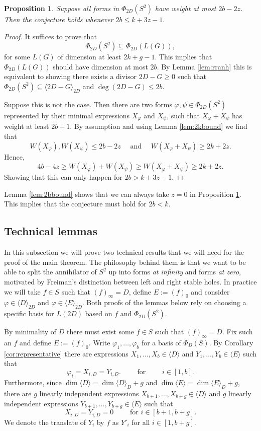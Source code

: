 \documentclass[12pt]{amsart}
\renewcommand{\leq}{\leqslant}
\renewcommand{\geq}{\geqslant}
\newtheorem{proposition}[theorem]{Proposition}
\theoremstyle{definition}
\newcommand{\divi}[1]{\langle #1 \rangle}
\begin{document}
	\begin{proposition} \label{prop:zbound}
		Suppose all forms in $\Phi_{2D}(S^2)$ have weight at most $2b - 2z$. Then the conjecture holds whenever $2b \leq k + 3z-1.$ 
	\end{proposition}
	\begin{proof}
		It suffices to prove that 
		$$\Phi_{2D}(S^2) \subseteq \Phi_{2D}(L(G)),$$
		for some $L(G)$ of dimension at least $2k + g - 1.$ This implies that $\Phi_{2D}(L(G))$ should have dimension at most $2b$. By Lemma \ref{lem:rranh} this is equivalent to showing there exists a divisor $2D - G \geq 0$ such that $\Phi_{2D}(S^2) \subseteq \divi {2D - G}_{2D}$ and $\deg(2D - G) \leq 2b$. 
		
		Suppose this is not the case. Then there are two forms $\varphi, \psi \in \Phi_{2D}(S^2)$ represented by their minimal expressions $X_\varphi$ and $X_\psi$, such that $X_\varphi + X_\psi$ has weight at least $2b + 1$. By assumption and using Lemma \ref{lem:2kbound} we find that 
		$$W(X_\varphi), W(X_\psi) \leq 2b - 2z \quad \text{ and } \quad W(X_\varphi + X_\psi) \geq 2k + 2z.$$ 
		Hence, 
		$$4b - 4z \geq W(X_\varphi) + W(X_\psi) \geq W(X_\varphi + X_\psi) \geq 2k+2z.$$ 
		Showing that this can only happen for $2b > k+3z - 1$. 
	\end{proof}
	
	Lemma \ref{lem:2bbound} shows that we can always take $z = 0$ in Proposition \ref{prop:zbound}. This implies that the conjecture must hold for $2b < k$.
	
	\subsection{Technical lemmas} \label{subs:basis} In this subsection we will prove two technical results that we will need for the proof of the main theorem. The philosophy behind them is that we want to be able to split the annihilator of $S^2$ up into forms \textit{at infinity} and forms \textit{at zero}, motivated by Freiman's distinction between left and right stable holes. In practice we will take $f \in S$ such that $(f)_\infty = D$, define $E := (f)_0$ and consider $\varphi \in \divi D_{2D}$ and $\varphi \in \divi E_{2D}$. Both proofs of the lemmas below rely on choosing a specific basis for $L(2D)$ based on $f$ and  $\Phi_{2D}(S^2)$. 
	
	By minimality of $D$ there must exist some $f \in S$ such that $(f)_\infty = D$. Fix such an $f$ and define $E:=(f)_0$. Write $\varphi_1, \ldots, \varphi_b$ for a basis of $\Phi_D(S)$. By Corollary \ref{cor:representative} there are expressions $X_1, \ldots, X_b \in \divi D$ and $Y_1, \ldots, Y_b \in \divi E$ such that 
	$$\varphi_i = X_{i, D} = Y_{i, D}. \qquad \text{ for } \qquad i \in [1, b].$$ 
	Furthermore, since $\dim \divi D = \dim \divi D_D + g$ and $\dim \divi E = \dim \divi E_D + g$, there are $g$ linearly independent expressions $X_{b+1}, \ldots, X_{b+g} \in \divi D$ and $g$ linearly independent expressions $Y_{b+1}, \ldots, Y_{b+g} \in \divi E$ such that $$X_{i, D} = Y_{i, D} = 0 \qquad \text{ for } i \in [b+1, b+g].$$ We denote the translate of $Y_i$ by $f$ as $Y'_i$ for all $i \in [1, b+g]$. 
	
\end{document}
